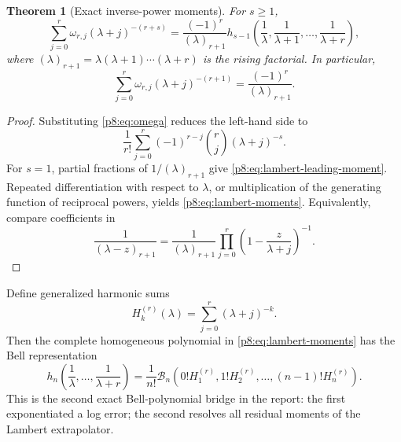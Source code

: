 \documentclass[11pt]{article}
\numberwithin{equation}{section}
\newtheorem{theorem}{Theorem}[section]
\theoremstyle{definition}
\theoremstyle{remark}
\begin{document}
\begin{theorem}[Exact inverse-power moments]
\label{p8:thm:lambert-moments}
For $s\ge1$,
\begin{equation}
\sum_{j=0}^{r}\omega_{r,j}(\lambda+j)^{-(r+s)}
=\frac{(-1)^r}{(\lambda)_{r+1}}
 h_{s-1}\!\left(\frac1\lambda,\frac1{\lambda+1},\ldots,
\frac1{\lambda+r}\right),
\label{p8:eq:lambert-moments}
\end{equation}
where $(\lambda)_{r+1}=\lambda(\lambda+1)\cdots(\lambda+r)$ is the rising factorial. In particular,
\begin{equation}
\sum_{j=0}^{r}\omega_{r,j}(\lambda+j)^{-(r+1)}
=\frac{(-1)^r}{(\lambda)_{r+1}}.
\label{p8:eq:lambert-leading-moment}
\end{equation}
\end{theorem}

\begin{proof}
Substituting \cref{p8:eq:omega} reduces the left-hand side to
\[
\frac1{r!}\sum_{j=0}^{r}(-1)^{r-j}\binom{r}{j}(\lambda+j)^{-s}.
\]
For $s=1$, partial fractions of $1/(\lambda)_{r+1}$ give \cref{p8:eq:lambert-leading-moment}. Repeated differentiation with respect to $\lambda$, or multiplication of the generating function of reciprocal powers, yields \cref{p8:eq:lambert-moments}. Equivalently, compare coefficients in
\[
\frac{1}{(\lambda-z)_{r+1}}
=\frac{1}{(\lambda)_{r+1}}
\prod_{j=0}^{r}\left(1-\frac{z}{\lambda+j}\right)^{-1}.
\]
\end{proof}

Define generalized harmonic sums
\begin{equation}
H_k^{(r)}(\lambda)=\sum_{j=0}^{r}(\lambda+j)^{-k}.
\label{p8:eq:Hrk}
\end{equation}
Then the complete homogeneous polynomial in \cref{p8:eq:lambert-moments} has the Bell representation
\begin{equation}
h_n\!\left(\frac1\lambda,\ldots,\frac1{\lambda+r}\right)
=\frac1{n!}\mathcal B_n\!\left(
0!H_1^{(r)},1!H_2^{(r)},\ldots,(n-1)!H_n^{(r)}
\right).
\label{p8:eq:h-Bell}
\end{equation}
This is the second exact Bell-polynomial bridge in the report: the first exponentiated a log error; the second resolves all residual moments of the Lambert extrapolator.
\end{document}
